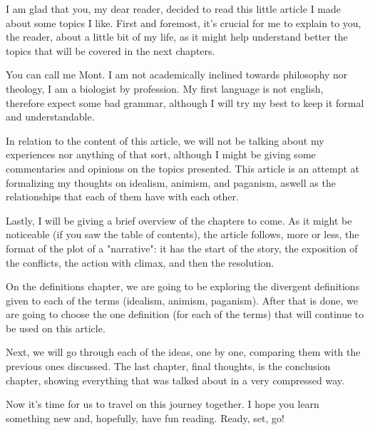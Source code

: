 I am glad that you, my dear reader, decided to read this little article I made about some topics I like.
First and foremost, it's crucial for me to explain to you, the reader, about a little bit
of my life, as it might help understand better the topics that will be covered in the next
chapters.

You can call me Mont. I am not academically inclined towards philosophy nor theology, I am a biologist
by profession. My first language is not english, therefore expect some bad grammar, although I will
try my best to keep it formal and understandable.

In relation to the content of this article, we will not be talking about my experiences nor anything of
that sort, although I might be giving some commentaries and opinions on the topics presented. This
article is an attempt at formalizing my thoughts on idealism, animism, and paganism, aswell as the
relationships that each of them have with each other.

Lastly, I will be giving a brief overview of the chapters to come. As it might be noticeable (if you saw
the table of contents), the article follows, more or less, the format of the plot of a "narrative": it has
the start of the story, the exposition of the conflicts, the action with climax, and then the resolution.

On the definitions chapter, we are going to be exploring the divergent definitions given to each of
the terms (idealism, animism, paganism). After that is done, we are going to choose the one definition
(for each of the terms) that will continue to be used on this article.

Next, we will go through each of the ideas, one by one, comparing them with the previous ones discussed.
The last chapter, final thoughts, is the conclusion chapter, showing everything that was talked
about in a very compressed way.

Now it's time for us to travel on this journey together. I hope you learn something new and, hopefully,
have fun reading. Ready, set, go!